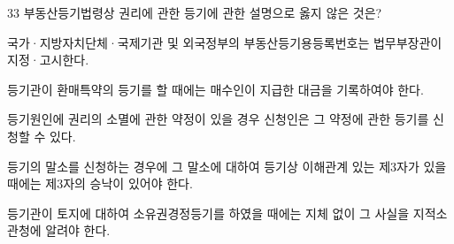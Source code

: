 \begin{question}{33}
부동산등기법령상 권리에 관한 등기에 관한 설명으로 옳지 않은 것은?
\begin{choices}
  \item 국가·지방자치단체·국제기관 및 외국정부의 부동산등기용등록번호는 법무부장관이 지정·고시한다.
  \item 등기관이 환매특약의 등기를 할 때에는 매수인이 지급한 대금을 기록하여야 한다.
  \item 등기원인에 권리의 소멸에 관한 약정이 있을 경우 신청인은 그 약정에 관한 등기를 신청할 수 있다.
  \item 등기의 말소를 신청하는 경우에 그 말소에 대하여 등기상 이해관계 있는 제3자가 있을 때에는 제3자의 승낙이 있어야 한다.
  \item 등기관이 토지에 대하여 소유권경정등기를 하였을 때에는 지체 없이 그 사실을 지적소관청에 알려야 한다.
\end{choices}
\end{question}

